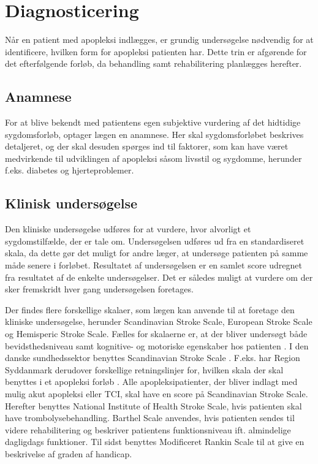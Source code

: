 \section{Diagnosticering}

Når en patient med apopleksi indlægges, er grundig undersøgelse nødvendig for at identificere, hvilken form for apopleksi patienten har. Dette trin er afgørende for det efterfølgende forløb, da behandling samt rehabilitering planlægges herefter. \cite{Sundhedsstyrelsen2009}

\subsection{Anamnese}
For at blive bekendt med patientens egen subjektive vurdering af det hidtidige sygdomsforløb, optager lægen en anamnese. Her skal sygdomsforløbet  beskrives detaljeret, og der skal desuden spørges ind til faktorer, som kan have været medvirkende til udviklingen af apopleksi såsom livsstil og sygdomme, herunder f.eks. diabetes og hjerteproblemer. \cite{Sundhedsstyrelsen2009}

\subsection{Klinisk undersøgelse}
Den kliniske undersøgelse udføres for at vurdere, hvor alvorligt et sygdomstilfælde, der er tale om. Undersøgelsen udføres ud fra en standardiseret skala, da dette gør det muligt for andre læger, at undersøge patienten på samme måde senere i forløbet. Resultatet af undersøgelsen er en samlet score udregnet fra resultatet af de enkelte undersøgelser. Det er således muligt at vurdere om der sker fremskridt hver gang undersøgelsen foretages. \cite{Sundhedsstyrelsen2009}

Der findes flere forskellige skalaer, som lægen kan anvende til at foretage den kliniske undersøgelse, herunder Scandinavian Stroke Scale, European Stroke Scale og Hemisperic Stroke Scale. Fælles for skalaerne er, at der bliver undersøgt både bevidsthedsniveau samt kognitive- og motoriske egenskaber hos patienten \cite{Center, Centera, Centerb, Centerc}. I den danske sundhedssektor benyttes Scandinavian Stroke Scale \cite{Apopleksi2009}. F.eks. har Region Syddanmark derudover forskellige retningslinjer for, hvilken skala der skal benyttes i et apopleksi forløb \cite{Syddanmark}. Alle apopleksipatienter, der bliver indlagt med mulig akut apopleksi eller TCI, skal have en score på Scandinavian Stroke Scale. Herefter benyttes National Institute of Health Stroke Scale, hvis patienten skal have trombolysebehandling. Barthel Scale anvendes, hvis patienten sendes til videre rehabilitering og beskriver patientens funktionsniveau ift. almindelige dagligdags funktioner. Til sidst benyttes Modificeret Rankin Scale til at give en beskrivelse af graden af handicap. \cite{Syddanmark}


